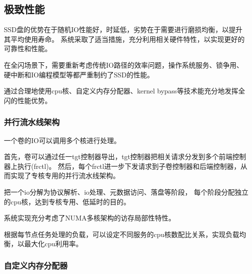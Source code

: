 

\subsection{极致性能}

SSD盘的优势在于随机IO性能好，时延低，劣势在于需要进行磨损均衡，以提升其平均使用寿命。
系统采取了适当措施，充分利用相关硬件特性，以实现更好的可靠性和性能。

在全闪场景下，需要重新考虑传统IO路径的效率问题，操作系统服务、锁争用、硬中断和IO编程模型等都严重制约了SSD的性能。

通过合理地使用cpu核、自定义内存分配器、kernel bypass等技术能充分地发挥全闪的性能优势。


\subsubsection{并行流水线架构}


一个卷的IO可以调用多个核进行处理。

首先，卷可以通过任一tgt控制器导出，tgt控制器把相关请求分发到多个前端控制器上执行(frctl)。
然后，每个frctl进一步下发请求到子卷控制器和后端控制器，从而实现了专核专用的并行流水线架构。


把一个io分解为协议解析、io处理、元数据访问、落盘等阶段，
每个阶段分配独立的cpu核，达到专核专用、低延时的目的。

系统实现充分考虑了NUMA多核架构的访存局部性特性。

根据每节点任务处理的负载，可以设定不同服务的cpu核数配比关系，实现负载均衡，以最大化cpu利用率。

\subsubsection{自定义内存分配器}

